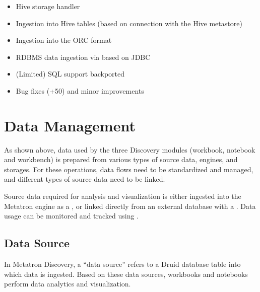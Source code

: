 \documentclass[letterpaper,10pt,english]{sphinxmanual}
\begin{document}
\begin{itemize}
\item {} 
Hive storage handler

\item {} 
Ingestion into Hive tables (based on connection with the Hive metastore)

\item {} 
Ingestion into the ORC format

\item {} 
RDBMS data ingestion via based on JDBC

\item {} 
(Limited) SQL support backported

\end{itemize}

\begin{itemize}
\item {} 
Bug fixes (+50) and minor improvements

\end{itemize}


\chapter{Data Management}
\label{\detokenize{discovery/part02/index:id1}}\label{\detokenize{discovery/part02/index::doc}}
\begin{figure}[H]
\centering

\noindent{}
\end{figure}

As shown above, data used by the three Discovery modules (workbook, notebook and workbench) is prepared from various types of source data, engines, and storages. For these operations, data flows need to be standardized and managed, and different types of source data need to be linked.

Source data required for analysis and visualization is either ingested into the Metatron engine as a , or linked directly from an external database with a . Data usage can be monitored and tracked using .


\section{Data Source}
\label{\detokenize{discovery/part02/data_source:id1}}\label{\detokenize{discovery/part02/data_source::doc}}
In Metatron Discovery, a “data source” refers to a Druid database table into which data is ingested. Based on these data sources, workbooks and notebooks perform data analytics and visualization.
\end{document}

